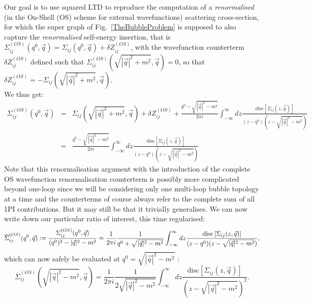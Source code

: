 \documentclass[11pt]{article}
\begin{document}
Our goal is to use squared LTD to reproduce the computation of a \emph{renormalised} (in the On-Shell (OS) scheme for external wavefunctions) scattering cross-section, for which the super graph of Fig.~\ref{TheBubbleProblem} is supposed to also capture the \emph{renormalised} self-energy insertion, that is $\Sigma_{ij}^{(OS)}(q^0, \vec{q})=\Sigma_{ij}(q^0, \vec{q})+\delta Z^{(OS)}_{ij}$, with the wavefunction counterterm $\delta Z^{(OS)}_{ij}$ defined such that $\Sigma_{ij}^{(OS)}(\sqrt{|\vec{q}|^2+m^2}, \vec{q})=0$, so that $\delta Z^{(OS)}_{ij}=-\Sigma_{ij}(\sqrt{|\vec{q}|^2+m^2}, \vec{q})$.\\
We thus get:
\begin{eqnarray}
\Sigma_{ij}^{(OS)}(q^0, \vec{q}) &=& \Sigma_{ij}(\sqrt{|\vec{q}|^2+m^2}, \vec{q}) + \delta Z^{(OS)}_{ij} +
\frac{q^0 -\sqrt{|\vec{q}|^2-m^2} }{2\pi i} \int_{-\infty}^\infty d z \frac{ 
\textrm{disc} \left[ \Sigma_{ij}(z, \vec{q}) \right]
}{( z-q^0) (z-\sqrt{|\vec{q}|^2-m^2}) } \nonumber \\
&=& \frac{q^0 -\sqrt{|\vec{q}|^2-m^2} }{2\pi i} \int_{-\infty}^\infty d z \frac{ 
\textrm{disc} \left[ \Sigma_{ij}(z, \vec{q}) \right]
}{( z-q^0) (z-\sqrt{|\vec{q}|^2-m^2}) }
\end{eqnarray}
Note that this renormalisation argument with the introduction of the complete OS wavefunction renormalisation counterterm is possibly more complicated beyond one-loop since we will be considering only one multi-loop bubble topology at a time and the counterterms of course always refer to the complete sum of all 1PI contributions.
But it may still be that it trivially generalises.
We can now write down our particular ratio of interest, this time regularised:
\begin{equation}
\overline{\Sigma}_{ij}^{(OS)}(q^0, \vec{q}) \vcentcolon= \frac{\Sigma_{ij}^{(OS)}(q^0, \vec{q})}{(q^0)^2-|\vec{q}|^2-m^2} = \frac{ 1 }{2\pi i} \frac{1}{q^0 + \sqrt{|\vec{q}|^2-m^2 }} \int_{-\infty}^\infty d z \frac{ 
\textrm{disc} \left[ \Sigma_{ij}(z, \vec{q}) \right]
}{( z-q^0) (z-\sqrt{|\vec{q}|^2-m^2}) },
\end{equation}
which can now safely be evaluated at $q^0 = \sqrt{|\vec{q}|^2-m^2 }$ :
\begin{equation}
\overline{\Sigma}_{ij}^{(OS)}(\sqrt{|\vec{q}|^2-m^2 }, \vec{q}) = \frac{ 1 }{2\pi i} \frac{1}{2\sqrt{|\vec{q}|^2-m^2 }} \int_{-\infty}^\infty d z \frac{ 
\textrm{disc} \left[ \Sigma_{ij}(z, \vec{q}) \right]
}{\left( z-\sqrt{|\vec{q}|^2-m^2 }\right)^2 }.
\label{FinalDiscExpressionBubbleProblem}
\end{equation}
\end{document}
